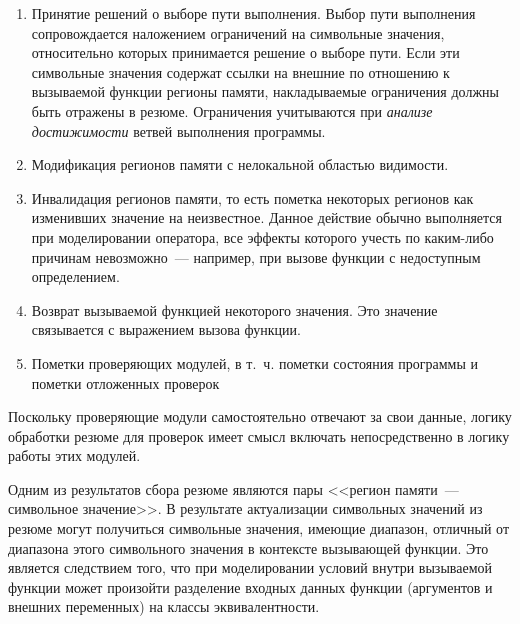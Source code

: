 \begin{enumerate}
 \item Принятие решений о выборе пути выполнения. Выбор пути выполнения сопровождается наложением ограничений на символьные значения, относительно которых принимается решение о выборе пути. Если эти символьные значения содержат ссылки на внешние по отношению к вызываемой функции регионы памяти, накладываемые ограничения должны быть отражены в резюме. Ограничения учитываются при \textit{анализе достижимости} ветвей выполнения программы.
 
 \item Модификация регионов памяти с нелокальной областью видимости.
 
 \item Инвалидация регионов памяти, то есть пометка некоторых регионов как изменивших значение на неизвестное. Данное действие обычно выполняется при моделировании оператора, все эффекты которого учесть по каким-либо причинам невозможно~--- например, при вызове функции с недоступным определением.
 
 \item Возврат вызываемой функцией некоторого значения. Это значение связывается с выражением вызова функции.
 
 \item Пометки проверяющих модулей, в т.~ч. пометки состояния программы и пометки отложенных проверок
 
\end{enumerate}

Поскольку проверяющие модули самостоятельно отвечают за свои данные, логику обработки резюме для проверок имеет смысл включать непосредственно в логику работы этих модулей.

Одним из результатов сбора резюме являются пары <<регион памяти~--- символьное значение>>. В результате актуализации символьных значений из резюме могут получиться символьные значения, имеющие диапазон, отличный от диапазона этого символьного значения в контексте вызывающей функции. Это является следствием того, что при моделировании условий внутри вызываемой функции может произойти разделение входных данных функции (аргументов и внешних переменных) на классы эквивалентности.

